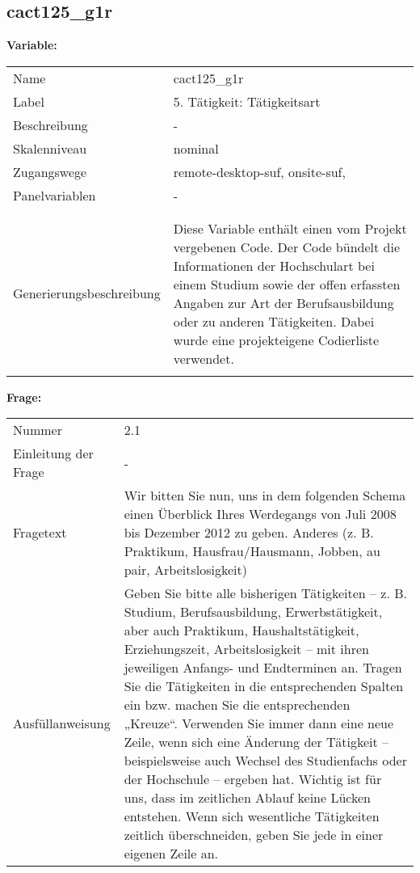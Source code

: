 	
	
	\subsection{cact125\_g1r}
	\label{subSection:cact125_g1r}

	\noindent\textbf{Variable:}\\
		\begin{tabular}{lL{11.3cm}}
			\label{tableVariable:cact125_g1r}
			Name & cact125\_g1r \\
			Label & 5. Tätigkeit: Tätigkeitsart \\
			Beschreibung & - \\
			Skalenniveau & nominal \\
			Zugangswege &
				remote-desktop-suf,
				onsite-suf,
 \\
			Panelvariablen & -
			 \\
			 \\
 \\
					Generierungsbeschreibung & Diese Variable enthält einen vom Projekt vergebenen Code. Der Code bündelt die  Informationen der Hochschulart bei einem Studium sowie der  offen erfassten Angaben zur Art der Berufsausbildung oder zu anderen Tätigkeiten. Dabei wurde eine projekteigene Codierliste verwendet.
				 \\	
			 \\
		\end{tabular}

		\vspace*{1 cm}
		\noindent\textbf{Frage:}\\
		\begin{tabular}{lL{11.3cm}}
			\label{tableQuestion:cact125_g1r}
			Nummer & 2.1 \\
			Einleitung der Frage & - \\
			Fragetext & Wir bitten Sie nun, uns in dem folgenden Schema einen Überblick Ihres Werdegangs von Juli 2008 bis Dezember 2012 zu geben.
Anderes
(z. B. Praktikum, Hausfrau/Hausmann, Jobben, au pair, Arbeitslosigkeit) \\
			Ausfüllanweisung & Geben Sie bitte alle bisherigen Tätigkeiten – z. B. Studium, Berufsausbildung, Erwerbstätigkeit, aber auch Praktikum, Haushaltstätigkeit,
Erziehungszeit, Arbeitslosigkeit – mit ihren jeweiligen Anfangs- und Endterminen an. Tragen Sie die Tätigkeiten in die entsprechenden Spalten ein bzw. machen Sie die entsprechenden „Kreuze“. Verwenden Sie immer dann eine neue Zeile, wenn sich eine Änderung der Tätigkeit – beispielsweise auch Wechsel des Studienfachs oder der Hochschule – ergeben hat. Wichtig ist für uns, dass im zeitlichen Ablauf keine Lücken entstehen. Wenn sich wesentliche Tätigkeiten zeitlich überschneiden, geben Sie jede in einer eigenen Zeile an. \\
		\end{tabular}





